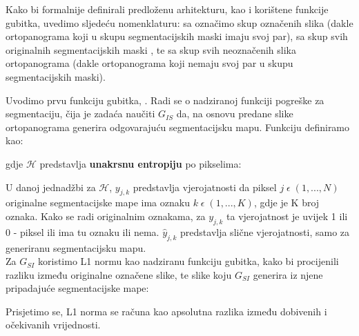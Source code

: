 \noindent Kako bi formalnije definirali predloženu arhitekturu, kao i korištene funkcije gubitka, uvedimo sljedeću nomenklaturu: sa  označimo skup označenih slika (dakle ortopanograma koji u skupu segmentacijskih maski imaju svoj par), sa  skup svih originalnih segmentacijskih maski , te sa  skup svih neoznačenih slika ortopanograma (dakle ortopanograma koji nemaju svoj par u skupu segmentacijskih maski). 

Uvodimo prvu funkciju gubitka, . Radi se o nadziranoj funkciji pogreške za segmentaciju, čija je zadaća naučiti $G_{IS}$ da, na osnovu predane slike ortopanograma generira odgovarajuću segmentacijsku mapu. Funkciju definiramo kao:

\begin{myequation}%
\end{myequation}

\noindent gdje $\mathcal{H}$ predstavlja \textbf{unakrsnu entropiju}  po pikselima:

\begin{myequation}%
\end{myequation}

\noindent U danoj jednadžbi za $\mathcal{H}$, $y_{j,k}$ predstavlja vjerojatnosti da piksel $j \; \epsilon \; (1, ..., N)$ originalne segmentacijske mape ima oznaku $k \; \epsilon \; (1, ..., K)$, gdje je K broj oznaka. Kako se radi originalnim oznakama, za $y_{j,k}$ ta vjerojatnost je uvijek 1 ili 0 - piksel ili ima tu oznaku ili nema. 
$\hat{y}_{j,k}$ predstavlja slične vjerojatnosti, samo za generiranu segmentacijsku mapu.\\

\noindent Za $G_{SI}$ koristimo L1 normu kao nadziranu funkciju gubitka, kako bi procijenili razliku između originalne označene slike, te slike koju $G_{SI}$ generira iz njene pripadajuće segmentacijske mape:

\begin{myequation}%
\end{myequation}

\noindent Prisjetimo se, L1 norma se računa kao apsolutna razlika između dobivenih i očekivanih vrijednosti.

